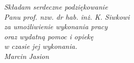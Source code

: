 \noindent
{\Large }





{\raggedleft\vfill\itshape{%
  Składam serdeczne podziękowanie\\
  \bigskip
  Panu prof. nzw. dr hab. inż. K. Siwkowi\\
  za umożliwienie wykonania pracy \\
  oraz wydatną pomoc i opiekę\\ 
  w czasie jej wykonania.\\
  \bigskip
  Marcin Jasion
}\par
}
